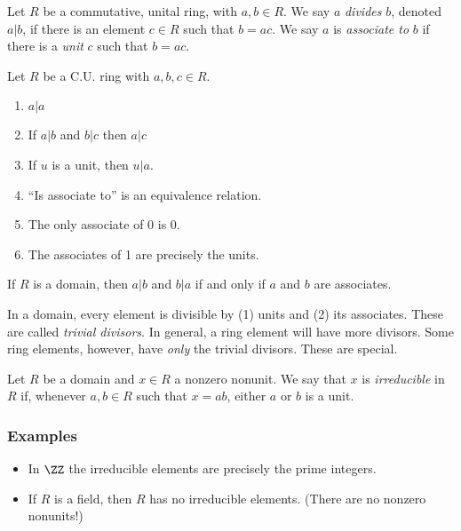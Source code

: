 \documentclass{article}
\begin{document}

\begin{dfn}
Let $R$ be a commutative, unital ring, with $a,b \in R$. We say $a$ \emph{divides} $b$, denoted $a|b$, if there is an element $c \in R$ such that $b = ac$. We say $a$ is \emph{associate to} $b$ if there is a \emph{unit} $c$ such that $b = ac$.
\end{dfn}

\begin{prop}
Let $R$ be a C.U. ring with $a,b,c \in R$.
\begin{enumerate}
\item $a|a$
\item If $a|b$ and $b|c$ then $a|c$
\item If $u$ is a unit, then $u|a$.
\item ``Is associate to'' is an equivalence relation.
\item The only associate of 0 is 0.
\item The associates of 1 are precisely the units.
\end{enumerate}
\end{prop}

\begin{prop}
If $R$ is a domain, then $a|b$ and $b|a$ if and only if $a$ and $b$ are associates.
\end{prop}

In a domain, every element is divisible by (1) units and (2) its associates. These are called \emph{trivial divisors}. In general, a ring element will have more divisors. Some ring elements, however, have \emph{only} the trivial divisors. These are special.

\begin{dfn}[Irreducible]
Let $R$ be a domain and $x \in R$ a nonzero nonunit. We say that $x$ is \emph{irreducible} in $R$ if, whenever $a,b \in R$ such that $x = ab$, either $a$ or $b$ is a unit.
\end{dfn}

\begin{center}
\end{center}

\subsubsection*{Examples}

\begin{itemize}
\item In $\ZZ$ the irreducible elements are precisely the prime integers.
\item If $R$ is a field, then $R$ has no irreducible elements. (There are no nonzero nonunits!)
\end{itemize}
\end{document}
